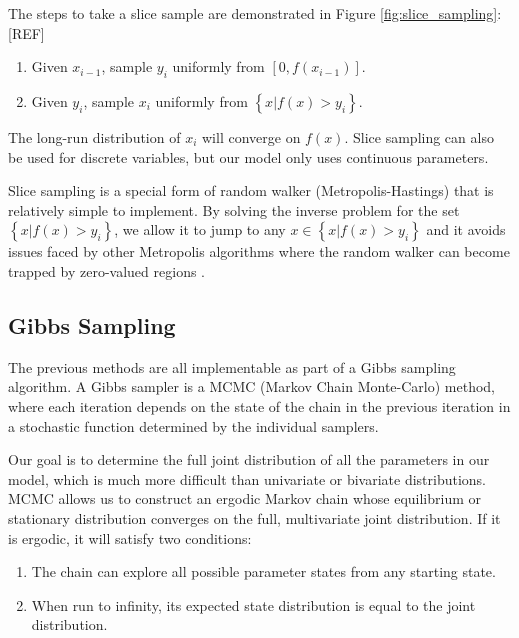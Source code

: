 \documentclass[a4paper, 12pt]{article}
\begin{document}
The steps to take a slice sample are demonstrated in Figure \ref{fig:slice_sampling}: [REF]

\begin{enumerate}
\item Given $x_{i-1}$, sample $y_i$ uniformly from $[0, f(x_{i-1})]$.
\item Given $y_i$, sample $x_i$ uniformly from $\left\{ x | f(x) > y_i \right\}$.
\end{enumerate}

The long-run distribution of $x_i$ will converge on $f(x)$. Slice sampling can also be used for discrete variables, but our model only uses continuous parameters.

Slice sampling is a special form of random walker (Metropolis-Hastings) that is relatively simple to implement. By solving the inverse problem for the set $\left\{ x | f(x) > y_i \right\}$, we allow it to jump to any $x\in \left\{ x | f(x) > y_i \right\}$ and it avoids issues faced by other Metropolis algorithms where the random walker can become trapped by zero-valued regions .

\subsection{Gibbs Sampling}
The previous methods are all implementable as part of a Gibbs sampling algorithm. A Gibbs sampler is a MCMC (Markov Chain Monte-Carlo) method, where each iteration depends on the state of the chain in the previous iteration in a stochastic function determined by the individual samplers.

Our goal is to determine the full joint distribution of all the parameters in our model, which is much more difficult than univariate or bivariate distributions. MCMC allows us to construct an ergodic Markov chain whose equilibrium or stationary distribution converges on the full, multivariate joint distribution. If it is ergodic, it will satisfy two conditions:

\begin{enumerate}
\item The chain can explore all possible parameter states from any starting state.
\item When run to infinity, its expected state distribution is equal to the joint distribution.
\end{enumerate}
\end{document}

